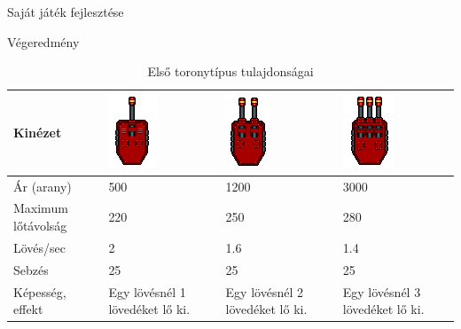 \begin{MyChapter}{Saját játék fejlesztése}
\begin{MySection}{Végeredmény}
		\begin{table}[H]
			\centering
			\caption{Első toronytípus tulajdonságai}
			\label{tab:torony_tipus_0}
			\begin{tabular}{|l|C{2.9cm}|C{2.9cm}|C{2.9cm}|}
				\hline
				Kinézet & \includegraphics[scale=0.76]{kepek/jatekHasznalat/torony_01} & \includegraphics[scale=0.76]{kepek/jatekHasznalat/torony_02} & \includegraphics[scale=0.76]{kepek/jatekHasznalat/torony_03} \\ \hline
				Ár (arany) & 500 & 1200 & 3000 \\ \hline
				Maximum lőtávolság & 220 & 250 & 280 \\ \hline
				Lövés/sec & 2 & 1.6 & 1.4 \\ \hline
				Sebzés & 25 & 25 & 25 \\ \hline
				Képesség, effekt & Egy lövésnél 1 lövedéket lő ki. & Egy lövésnél 2 lövedéket lő ki. & Egy lövésnél 3 lövedéket lő ki. \\ \hline
			\end{tabular}
		\end{table}
		

\end{MySection}
\end{MyChapter}
